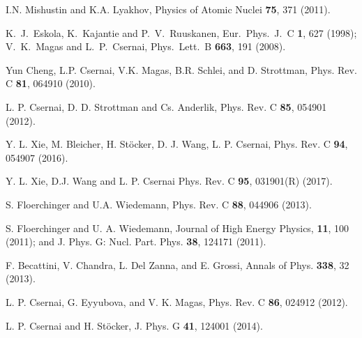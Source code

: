 \documentclass[aps,prc,twocolumn,floatfix,showpacs,a4paper,
nofootinbib,amsmath,amssymb]{revtex4-1}
\begin{document}
\begin{thebibliography}{99}
I.N. Mishustin and K.A. Lyakhov,
Physics of Atomic Nuclei {\bf 75}, 371 (2011).


  
  K.~J.~Eskola, K.~Kajantie and P.~V.~Ruuskanen,
  Eur.\ Phys.\ J.\ C {\bf 1}, 627 (1998);
   V.~K.~Magas and L.~P.~Csernai,
  Phys.\ Lett.\ B {\bf 663}, 191 (2008).


Yun Cheng, L.P. Csernai, V.K. Magas, B.R. Schlei, and D. Strottman,
Phys. Rev. C {\bf 81}, 064910 (2010).

  L. P. Csernai, D. D. Strottman and Cs. Anderlik,
  Phys. Rev. C {\bf 85}, 054901 (2012).


Y. L. Xie, M. Bleicher, H. St{\"o}cker, D. J. Wang, L. P. Csernai,
Phys. Rev. C {\bf 94}, 054907 (2016).

Y. L. Xie, D.J. Wang and L. P. Csernai
Phys. Rev. C {\bf 95}, 031901(R) (2017).



S. Floerchinger and U.A. Wiedemann, 
Phys. Rev. C {\bf 88}, 044906 (2013).

S. Floerchinger and U. A. Wiedemann, Journal of High Energy Physics, 
{\bf 11}, 100 (2011);  and
J. Phys. G: Nucl. Part. Phys. {\bf 38}, 124171 (2011).


F. Becattini, V. Chandra, L. Del Zanna, and E. Grossi,
Annals of Phys. {\bf 338}, 32 (2013).


L. P. Csernai, G. Eyyubova, and V. K. Magas,
Phys. Rev. C {\bf 86}, 024912 (2012).

L. P. Csernai and H. St\"ocker, 
J. Phys. G {\bf 41},  124001 (2014).


\end{thebibliography}
\end{document}
